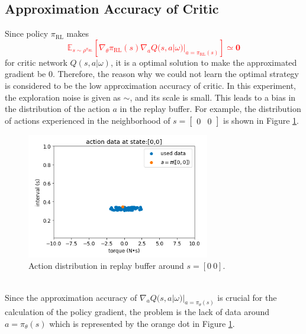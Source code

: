 \documentclass[english, dvipdfmx]{ampmt}             %
\newcommand{\unc}[1]{\textcolor{red}{#1}} %
\newcommand{\expect}{\mathbb{E}}
\begin{document}
\subsection{Approximation Accuracy of Critic}
Since policy $\pi_{\textrm{RL}}$ makes
\unc{
\begin{equation}
	\expect_{s\sim\rho^{\pi_{\textrm{RL}}}}[
	\nabla_{\theta}\pi_{\textrm{RL}}(s)\nabla_{a}Q(s,a|\omega)|_{a=\pi_{\textrm{RL}}(s)}] \simeq \bm{0}
\end{equation}
}
for critic network $Q(s,a|\omega)$, it is a optimal solution to make the approximated gradient be 0. Therefore, the reason why we could not learn the optimal strategy is considered to be the low approximation accuracy of critic. In this experiment, the exploration noise is given as $\sim$, and its scale is small. This leads to a bias in the distribution of the action $a$ in the replay buffer. For example, the distribution of actions experienced in the neighborhood of $s=\begin{bmatrix}0 & 0\end{bmatrix}$ is shown in Figure \ref{data_distribution}.
\begin{figure}[h]
	\centering
 	\includegraphics[width=8cm]{data_distribution.png}
 	\caption{Action distribution in replay buffer around $s=[0~0]$.} \label{data_distribution}
\end{figure}\\
Since the approximation accuracy of $\nabla_{a} Q(s,a|\omega)|_{a=\pi_{\theta}(s)}$ is crucial for the calculation of the policy gradient, the problem is the lack of data around $a=\pi_{\theta}(s)$ which is represented by the orange dot in Figure \ref{data_distribution}.
\end{document}
